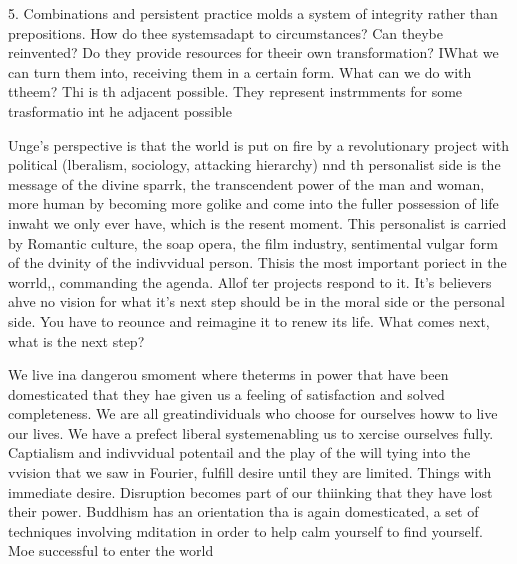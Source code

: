 \documentclass[12pt,letterpaper]{article}
\begin{document}
5. Combinations and persistent practice molds a system of integrity rather than prepositions.  How do thee systemsadapt to circumstances?  Can theybe reinvented?  Do they provide resources for theeir own transformation?  IWhat we can turn them into, receiving them in a certain form.  What can we do with ttheem?  Thi is th adjacent possible.  They represent instrmments for some trasformatio int he adjacent possible

Unge's perspective is that the world is put on fire by a revolutionary project with political (lberalism, sociology, attacking hierarchy) nnd th personalist side is the message of the divine sparrk, the transcendent power of the man and woman, more human by becoming more golike and come into the fuller possession of life inwaht we only ever have, which is the resent moment. This personalist is carried by Romantic culture, the soap opera, the film industry, sentimental vulgar form of the dvinity of the indivvidual person.  Thisis the most important poriect in the worrld,, commanding the agenda.  Allof ter projects respond to it.    It's believers ahve no vision for what it's next step should be in the moral side or the personal side.  You have to reounce and reimagine it to renew its life.  What comes next, what is the next step?

We live ina dangerou smoment where theterms in power that have been domesticated that they hae given us a feeling of  satisfaction and solved completeness.  We are all greatindividuals who choose for ourselves howw to  live our lives.  We have a  prefect liberal systemenabling us to xercise ourselves fully. Captialism and indivvidual potentail and the play of the will tying into the vvision that we saw in Fourier, fulfill desire until they are limited.  Things with immediate desire.  Disruption becomes part of our thiinking that they have lost their power.  Buddhism has an orientation tha is again domesticated, a set of techniques involving mditation in order to help calm yourself to find yourself.    Moe successful to enter the world
\end{document}
